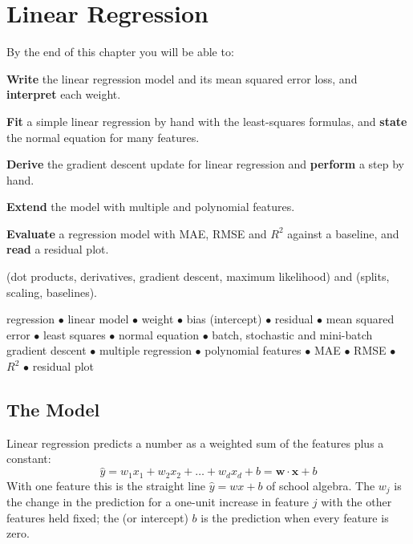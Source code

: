 \chapter{Linear Regression}\label{ch:linreg}

\begin{outcomes}
By the end of this chapter you will be able to:
\begin{tight}
  \item \textbf{Write} the linear regression model and its mean squared error
        loss, and \textbf{interpret} each weight.
  \item \textbf{Fit} a simple linear regression by hand with the least-squares
        formulas, and \textbf{state} the normal equation for many features.
  \item \textbf{Derive} the gradient descent update for linear regression and
        \textbf{perform} a step by hand.
  \item \textbf{Extend} the model with multiple and polynomial features.
  \item \textbf{Evaluate} a regression model with MAE, RMSE and $R^2$ against a
        baseline, and \textbf{read} a residual plot.
\end{tight}
\end{outcomes}

\begin{prereq}
 (dot products, derivatives, gradient descent, maximum likelihood)
and  (splits, scaling, baselines).
\end{prereq}

\begin{keyterms}
regression $\bullet$ linear model $\bullet$ weight $\bullet$ bias (intercept)
$\bullet$ residual $\bullet$ mean squared error $\bullet$ least squares
$\bullet$ normal equation $\bullet$ batch, stochastic and mini-batch gradient
descent $\bullet$ multiple regression $\bullet$ polynomial features $\bullet$
MAE $\bullet$ RMSE $\bullet$ $R^2$ $\bullet$ residual plot
\end{keyterms}

\section{The Model}

Linear regression predicts a number as a weighted sum of the features plus a
constant:
\[
\hat{y} = w_1 x_1 + w_2 x_2 + \dots + w_d x_d + b = \mathbf{w}\cdot\mathbf{x} + b
\]
With one feature this is the straight line $\hat{y} = wx + b$ of school algebra.
The  $w_j$ is the change in the prediction for a one-unit increase in
feature $j$ with the other features held fixed; the  (or intercept)
$b$ is the prediction when every feature is zero.

